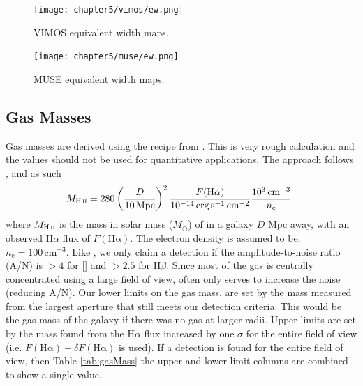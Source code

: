 		\begin{figure}
			\centering
			\texttt{[image: chapter5/vimos/ew.png]}
			\caption[VIMOS equivalent width maps]{VIMOS equivalent width maps.} 
			\label{fig:VIMOS_ew}
		\end{figure}
		\begin{figure}
			\centering
			\texttt{[image: chapter5/muse/ew.png]}
			\caption[MUSE equivalent width maps]{MUSE equivalent width maps.} 
			\label{fig:MUSE_ew}
		\end{figure}

	\subsection{Gas Masses}
		\label{subsec:GasMass}

		Gas masses are derived using the recipe from \citet{Sarzi2005}. This is very rough calculation and the values should not be used for quantitative applications. The approach follows \citet{Kim1989}, and as such
		\begin{equation}
			M_\text{\ion{H}{ii}} = 280 \left(\frac{D}{10\, \mathrm{Mpc}}\right)^2 \frac{F(\mathrm{H\alpha})}{10^{-14} \, \mathrm{erg \, s^{-1} \, cm^{-2}}} \frac{10^3 \, \mathrm{cm^{-3}}}{n_\mathrm{e}} \, ,
		\end{equation}
		where $M_\text{\ion{H}{ii}}$ is the mass in solar mass ($M_\odot$) of  in a galaxy $D$ Mpc away, with an observed H$\alpha$ flux of $F(\mathrm{H\alpha})$. The electron density is assumed to be, $n_\mathrm{e} = 100 \, \mathrm{cm^{-3}}$. 
		Like \citet{Sarzi2005}, we only claim a detection if the amplitude-to-noise ratio (A/N) is $>4$ for [] and $>2.5$ for H$\beta$. Since most of the gas is centrally concentrated using a large field of view, often only serves to increase the noise (reducing A/N). Our lower limits on the gas mass, are set by the mass measured from the largest aperture that still meets our detection criteria. This would be the gas mass of the galaxy if there was no gas at larger radii. Upper limits are set by the mass found from the H$\alpha$ flux increased by one $\sigma$ for the entire field of view (i.e. $F(\mathrm{H\alpha})+\delta F(\mathrm{H\alpha})$ is used). If a detection is found for the entire field of view, then Table \ref{tab:gasMass} the upper and lower limit columns are combined to show a single value. 



